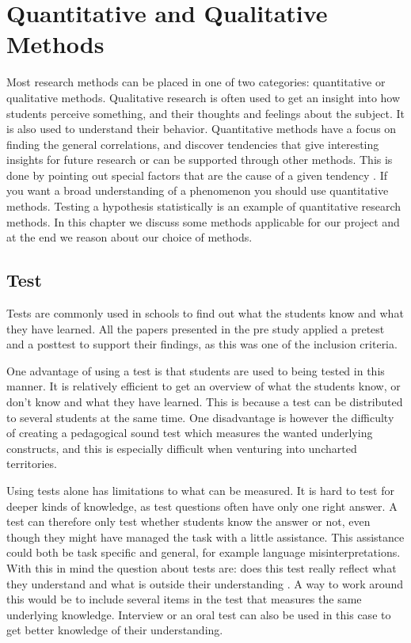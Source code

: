 \section{Quantitative and Qualitative Methods}\label{sec:methodsss}
Most research methods can be placed in one of two categories: quantitative or qualitative methods. Qualitative research is often used to get an insight into how students perceive something, and their thoughts and feelings about the subject. It is also used to understand their behavior. Quantitative methods have a focus on finding the general correlations, and discover tendencies that give interesting insights for future research or can be supported through other methods. This is done by pointing out special factors that are the cause of a given tendency \cite{tjora2012kvalitative}. If you want a broad understanding of a phenomenon you should use quantitative methods. Testing a hypothesis statistically is an example of quantitative research methods. In this chapter we discuss some methods applicable for our project and at the end we reason about our choice of methods. 

\subsection*{Test}
Tests are commonly used  in schools to find out what the students know and what they have learned. All the papers presented in the pre study applied a pretest and a posttest to support their findings, as this was one of the inclusion criteria. 

\bigskip\noindent
One advantage of using a test is that students are used to being tested in this manner. It is relatively efficient to get an overview of what the students know, or don't know and what they have learned. This is because a test can be distributed to several students at the same time. 
One disadvantage is however the difficulty of creating a pedagogical sound test which measures the wanted underlying constructs, and this is especially difficult when venturing into uncharted territories. 

\bigskip\noindent
Using tests alone has limitations to what can be measured. It is hard to test for deeper kinds of knowledge, as test questions often have only one right answer. A test can therefore only test whether students know the answer or not, even though they might have managed the task with a little assistance. This assistance could both be task specific and general, for example language misinterpretations. With this in mind the question about tests are: does this test really reflect what they understand and what is outside their understanding \cite{andersen2009evaluering}. A way to work around this would be to include several items in the test that measures the same underlying knowledge. Interview or an oral test can also be used in this case to get better knowledge of their understanding.

